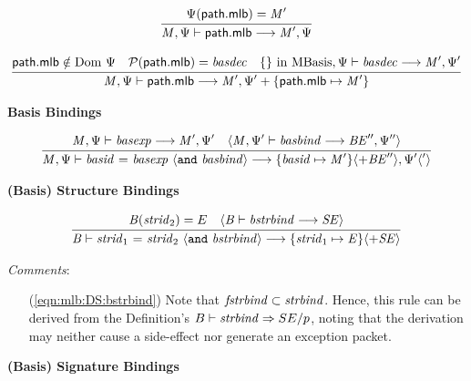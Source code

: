 \begin{equation}
\judge{
\Psi(\msf{path.mlb}) = \mit{M}'
}{
\mit{M}, \Psi  \vdash \msf{path.mlb}  \longrightarrow \mit{M}', \Psi
}
\end{equation}

\begin{equation}
\judge{
\msf{path.mlb} \notin \mrm{Dom}~\Psi \quad
\mcal{P}(\msf{path.mlb}) = \mit{basdec} \quad
\{\} ~\mrm{in}~ \mrm{MBasis}, \Psi  \vdash \mit{basdec} \longrightarrow \mit{M}', \Psi'
}{
\mit{M}, \Psi  \vdash \msf{path.mlb}  \longrightarrow \mit{M}', \Psi' + \{\msf{path.mlb} \mapsto \mit{M}'\} 
}
\end{equation}

{\large\noindent
\textbf{Basis Bindings} \hfill 
{}
}

\begin{equation}
\judge{
\mit{M}, \Psi \vdash \mit{basexp} \longrightarrow \mit{M}', \Psi' \quad
\langle\mit{M}, \Psi' \vdash \mit{basbind} \longrightarrow \mit{BE}'', \Psi''\rangle
}{
\mit{M}, \Psi  \vdash \mit{basid} ~\mtt{=}~ \mit{basexp} ~\langle\mtt{and}~\mit{basbind}\rangle \longrightarrow 
\{\mit{basid} \mapsto \mit{M}'\} \langle+ \mit{BE}''\rangle, \Psi'\langle'\rangle
}
\end{equation}

{\large\noindent
\textbf{(Basis) Structure Bindings} \hfill 
{}
}

\begin{equation}
\label{eqn:mlb:DS:bstrbind}
\judge{
\mit{B}(\mit{strid}_2) = E \quad
\langle\mit{B} \vdash \mit{bstrbind} \longrightarrow \mit{SE}\rangle
}{
\mit{B} \vdash \mit{strid}_1 ~\mtt{=}~ \mit{strid}_2 ~\langle\mtt{and}~\mit{bstrbind}\rangle \longrightarrow 
\{\mit{strid}_1 \mapsto \mit{E}\} \langle+ \mit{SE}\rangle
}
\end{equation}

\noindent
\textit{Comments}:
\begin{itemize}
\item[(\ref{eqn:mlb:DS:bstrbind})] Note that $\mit{fstrbind} \subset
\mit{strbind}$.  Hence, this rule can be derived from the
Definition's $B \vdash \mit{strbind} \Rightarrow SE / p$, noting that
the derivation may neither cause a side-effect nor generate an
exception packet.
\end{itemize}

{\large\noindent
\textbf{(Basis) Signature Bindings} \hfill 
{}
}

